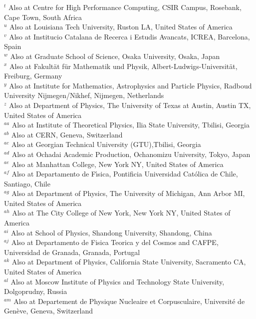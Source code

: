 \begin{flushleft}
$^{t}$ Also at Centre for High Performance Computing, CSIR Campus, Rosebank, Cape Town, South Africa\\
$^{u}$ Also at Louisiana Tech University, Ruston LA, United States of America\\
$^{v}$ Also at Institucio Catalana de Recerca i Estudis Avancats, ICREA, Barcelona, Spain\\
$^{w}$ Also at Graduate School of Science, Osaka University, Osaka, Japan\\
$^{x}$ Also at Fakult{\"a}t f{\"u}r Mathematik und Physik, Albert-Ludwigs-Universit{\"a}t, Freiburg, Germany\\
$^{y}$ Also at Institute for Mathematics, Astrophysics and Particle Physics, Radboud University Nijmegen/Nikhef, Nijmegen, Netherlands\\
$^{z}$ Also at Department of Physics, The University of Texas at Austin, Austin TX, United States of America\\
$^{aa}$ Also at Institute of Theoretical Physics, Ilia State University, Tbilisi, Georgia\\
$^{ab}$ Also at CERN, Geneva, Switzerland\\
$^{ac}$ Also at Georgian Technical University (GTU),Tbilisi, Georgia\\
$^{ad}$ Also at Ochadai Academic Production, Ochanomizu University, Tokyo, Japan\\
$^{ae}$ Also at Manhattan College, New York NY, United States of America\\
$^{af}$ Also at Departamento de F{\'\i}sica, Pontificia Universidad Cat{\'o}lica de Chile, Santiago, Chile\\
$^{ag}$ Also at Department of Physics, The University of Michigan, Ann Arbor MI, United States of America\\
$^{ah}$ Also at The City College of New York, New York NY, United States of America\\
$^{ai}$ Also at School of Physics, Shandong University, Shandong, China\\
$^{aj}$ Also at Departamento de Fisica Teorica y del Cosmos and CAFPE, Universidad de Granada, Granada, Portugal\\
$^{ak}$ Also at Department of Physics, California State University, Sacramento CA, United States of America\\
$^{al}$ Also at Moscow Institute of Physics and Technology State University, Dolgoprudny, Russia\\
$^{am}$ Also at Departement  de Physique Nucleaire et Corpusculaire, Universit{\'e} de Gen{\`e}ve, Geneva, Switzerland\\

\end{flushleft}
